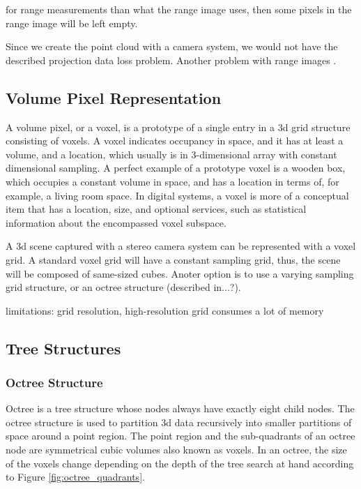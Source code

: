 \documentclass[12pt,a4paper,oneside,pdftex]{report}
\begin{document}
for range measurements than what the range image uses, then some pixels in the range image will be left empty.

Since we create the point cloud with a camera system, we would not have the described projection data loss problem. Another problem with range images       \cite{Unnikrishnan08}.

\subsection{Volume Pixel Representation}
\label{subsection:volume_pixel_representation}

A volume pixel, or a voxel, is a prototype of a single entry in a 3d grid structure consisting of voxels. A voxel indicates occupancy in space, and it has at least a volume, and a location, which usually is in 3-dimensional array with constant dimensional sampling. A perfect example of a prototype voxel is a wooden box, which occupies a constant volume in space, and has a location in terms of, for example, a living room space. In digital systems, a voxel is more of a conceptual item that has a location, size, and optional services, such as statistical information about the encompassed voxel subspace. 

A 3d scene captured with a stereo camera system can be represented with a voxel grid. A standard voxel grid will have a constant sampling grid, thus, the scene will be composed of same-sized cubes. Anoter option is to use a varying sampling grid structure, or an octree structure (described in...?).

limitations: grid resolution, high-resolution grid consumes a lot of memory

\subsection{Tree Structures}
\label{subsection:tree_structures}

\subsubsection{Octree Structure}

Octree is a tree structure whose nodes always have exactly eight child nodes. The octree structure is used to partition 3d data recursively into smaller partitions of space around a point region. The point region and the sub-quadrants of an octree node are symmetrical cubic volumes also known as voxels. In an octree, the size of the voxels change depending on the depth of the tree search at hand according to Figure \ref{fig:octree_quadrants}.
\end{document}

